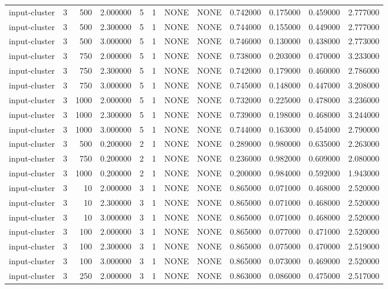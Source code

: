 \begin{tabular}{lrrrllllrrrr}
input-cluster & 3 & 500 & 2.000000 & 5 & 1 & NONE & NONE & 0.742000 & 0.175000 & 0.459000 & 2.777000 \\
input-cluster & 3 & 500 & 2.300000 & 5 & 1 & NONE & NONE & 0.744000 & 0.155000 & 0.449000 & 2.777000 \\
input-cluster & 3 & 500 & 3.000000 & 5 & 1 & NONE & NONE & 0.746000 & 0.130000 & 0.438000 & 2.773000 \\
input-cluster & 3 & 750 & 2.000000 & 5 & 1 & NONE & NONE & 0.738000 & 0.203000 & 0.470000 & 3.233000 \\
input-cluster & 3 & 750 & 2.300000 & 5 & 1 & NONE & NONE & 0.742000 & 0.179000 & 0.460000 & 2.786000 \\
input-cluster & 3 & 750 & 3.000000 & 5 & 1 & NONE & NONE & 0.745000 & 0.148000 & 0.447000 & 3.208000 \\
input-cluster & 3 & 1000 & 2.000000 & 5 & 1 & NONE & NONE & 0.732000 & 0.225000 & 0.478000 & 3.236000 \\
input-cluster & 3 & 1000 & 2.300000 & 5 & 1 & NONE & NONE & 0.739000 & 0.198000 & 0.468000 & 3.244000 \\
input-cluster & 3 & 1000 & 3.000000 & 5 & 1 & NONE & NONE & 0.744000 & 0.163000 & 0.454000 & 2.790000 \\
input-cluster & 3 & 500 & 0.200000 & 2 & 1 & NONE & NONE & 0.289000 & 0.980000 & 0.635000 & 2.263000 \\
input-cluster & 3 & 750 & 0.200000 & 2 & 1 & NONE & NONE & 0.236000 & 0.982000 & 0.609000 & 2.080000 \\
input-cluster & 3 & 1000 & 0.200000 & 2 & 1 & NONE & NONE & 0.200000 & 0.984000 & 0.592000 & 1.943000 \\
input-cluster & 3 & 10 & 2.000000 & 3 & 1 & NONE & NONE & 0.865000 & 0.071000 & 0.468000 & 2.520000 \\
input-cluster & 3 & 10 & 2.300000 & 3 & 1 & NONE & NONE & 0.865000 & 0.071000 & 0.468000 & 2.520000 \\
input-cluster & 3 & 10 & 3.000000 & 3 & 1 & NONE & NONE & 0.865000 & 0.071000 & 0.468000 & 2.520000 \\
input-cluster & 3 & 100 & 2.000000 & 3 & 1 & NONE & NONE & 0.865000 & 0.077000 & 0.471000 & 2.520000 \\
input-cluster & 3 & 100 & 2.300000 & 3 & 1 & NONE & NONE & 0.865000 & 0.075000 & 0.470000 & 2.519000 \\
input-cluster & 3 & 100 & 3.000000 & 3 & 1 & NONE & NONE & 0.865000 & 0.073000 & 0.469000 & 2.520000 \\
input-cluster & 3 & 250 & 2.000000 & 3 & 1 & NONE & NONE & 0.863000 & 0.086000 & 0.475000 & 2.517000 \\

\end{tabular}
